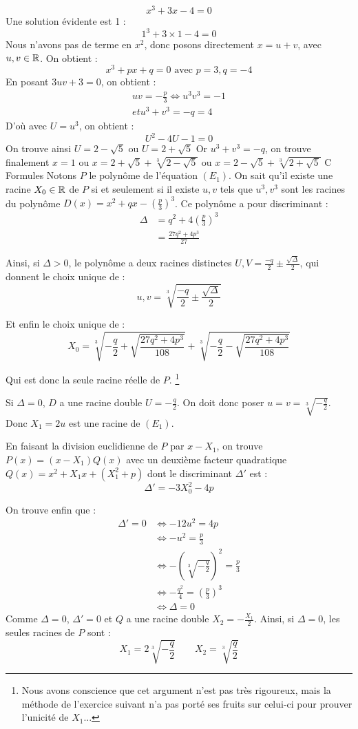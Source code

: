\documentclass[]{../templates/homework}
\begin{document}
	$$ x^3 + 3x - 4 = 0$$
	\question Une solution évidente est 1 : $$1^3 + 3\times1 - 4 = 0$$
	\question Nous n'avons pas de terme en $x^2$, donc posons directement $x = u+v$, avec $u, v \in \mathbb R$.
	On obtient : $$x^3 + px + q = 0 \text{ avec } p=3, q=-4$$
	En posant $3uv + 3 = 0$, on obtient : 
\begin{align*}
 uv = -\frac{p}{3} \iff u^3v^3 = -1 \\
et u^3 + v^3 = -q = 4
\end{align*}
	D'où avec $U = u^3$, on obtient : $$U^2 -4U -1 =0$$
	On trouve ainsi $U = 2 - \sqrt{5}$ ou $U = 2 + \sqrt{5}$
	Or $u^3 + v^3 = -q$, on trouve finalement $x=1$ ou $x = 2 + \sqrt{5} + \sqrt[3]{2 - \sqrt{5}}$ ou $x = 2 - \sqrt{5} + \sqrt[3]{2 + \sqrt{5}}$
	\partie C {Formules}
	 Notons $P$ le polynôme de l'équation $(E_1)$. On sait qu'il existe une racine $X_0 \in \mathbb R$ de $P$ si et seulement si il existe $u,v$ tels que $u^3,v^3$ sont les racines du polynôme $D(x) = x^2 + qx - \left(\frac p 3\right)^3$.
	Ce polynôme a pour discriminant :
	\begin{align*}
		\Delta &= q^2 + 4\left(\frac p 3\right)^3 \\
		&=  \frac {27q^2 + 4p^3}{27}
	\end{align*}
	
	
	Ainsi, si $\Delta > 0$, le polynôme a deux racines distinctes $U,V = \frac {-q}{2} \pm \frac {\sqrt \Delta} {2}$, qui donnent le choix unique de :
	$$u,v = \sqrt[3]{\frac {-q}{2} \pm \frac {\sqrt \Delta} {2}}$$
	
	Et enfin le choix unique de :
	$$X_0 = \sqrt[3]{-\frac {q}{2} + \sqrt {\frac {27q^2 + 4p^3}{108}} } + \sqrt[3]{-\frac {q}{2} - \sqrt {\frac {27q^2 + 4p^3}{108}} }$$
	
	Qui est donc la seule racine réelle de $P$. \footnote{Nous avons conscience que cet argument n'est pas très rigoureux, mais la méthode de l'exercice suivant n'a pas porté ses fruits sur celui-ci pour prouver l'unicité de $X_1$...}
	
	\subproblem Si $\Delta = 0$, $D$ a une racine double $U = -\frac q {2}$. On doit donc poser $u = v = \sqrt[3]{-\frac q 2}$. Donc $X_1 = 2u$ est une racine de $(E_1)$.
	
	
	En faisant la division euclidienne de $P$ par $x-X_1$, on trouve $P(x) = (x-X_1)Q(x)$ avec un deuxième facteur quadratique $Q(x) = x^2 + X_1x + (X_1^2 + p)$ dont le discriminant $\Delta'$ est :
	$$\Delta' = -3X_0^2 - 4p$$
	
	On trouve enfin que :
	\begin{align*}
		\Delta' = 0 &\iff -12u^2 = 4p \\
		&\iff -u^2 = \frac p 3\\
		&\iff -(\sqrt[3]{-\frac q 2})^2 = \frac p3\\
		&\iff -\frac {q^2} 4 = (\frac p 3)^3\\
		&\iff \Delta = 0
	\end{align*}
	Comme $\Delta = 0$, $\Delta' = 0$ et $Q$ a une racine double $X_2 = -\frac {X_1} 2$.
	Ainsi, si $\Delta = 0$, les seules racines de $P$ sont :
	\begin{equation*}
		X_1 = 2\sqrt[3]{-\frac q 2} \qquad X_2 = \sqrt[3]{\frac q 2}
	\end{equation*}
\end{document}

